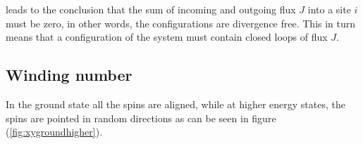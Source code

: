 leads to the conclusion that the sum of incoming and outgoing flux $J$ into a site $i$ must be zero, in other words, the configurations are divergence free. This in turn means that a configuration of the system must contain closed loops of flux $J$.


\subsection{Winding number}
\label{subsec:XYWindingNum}

In the ground state all the spins are aligned, while at higher energy states, the spins are pointed in random directions as can be seen in figure (\ref{fig:xygroundhigher}).

